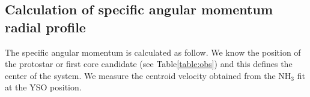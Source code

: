 \subsection{Calculation of specific angular momentum radial profile}
The specific angular momentum is calculated as follow.
We know the position of the protostar or first core candidate (see Table\ref{table:obs}) and this 
defines the center of the system.
We measure the centroid velocity obtained from the NH$_3$ fit at the YSO position. 